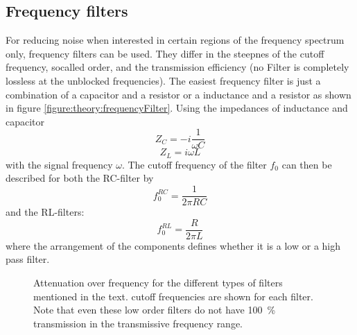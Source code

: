             \subsection{Frequency filters}
            For reducing noise when interested in certain regions of the frequency spectrum only, frequency filters can be used. They differ in the steepnes of the cutoff frequency, socalled order, and the transmission efficiency (no Filter is completely lossless at the unblocked frequencies). The easiest frequency filter is just a combination of a capacitor and a resistor or a inductance and a resistor as shown in figure \ref{figure:theory:frequencyFilter}. Using the impedances of inductance and capacitor
                \begin{equation*}
                    Z_C = -i\frac{1}{\omega C}
                \end{equation*}
                \begin{equation*}
                    Z_L = {i\omega L}
                \end{equation*} 
                with the signal frequency $\omega$. The cutoff frequency of the filter $f_0$ can then be described for both the RC-filter by
                \begin{equation}
                    f_0^{RC} = \frac{1}{2\pi R C}
                \end{equation}
                and the RL-filters:
                \begin{equation}
                    f_0^{RL} = \frac{R}{2\pi L}
                \end{equation}
            where the arrangement of the components defines whether it is a low or a high pass filter.
            \begin{figure}
                \centering
                \caption[Frequency filters]{Attenuation over frequency for the different types of filters mentioned in the text. cutoff frequencies are shown for each filter. Note that even these low order filters do not have \SI{100}{\percent} transmission in the transmissive frequency range.}
            \end{figure}
